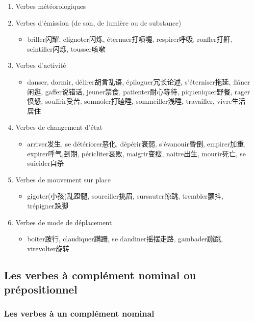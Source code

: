 \documentclass[UTF8]{report}
\begin{document}
\begin{enumerate}
    \item Verbes météorologiques
    \item Verbes d’émission (de son, de lumière ou de substance) 
    \begin{itemize}
        \item briller闪耀, clignoter闪烁, éternuer打喷嚏, respirer呼吸, ronfler打鼾, scintiller闪烁, tousser咳嗽
    \end{itemize}
    \item Verbes d’activité
    \begin{itemize}
        \item danser, dormir, délirer胡言乱语, épiloguer冗长论述, s’éterniser拖延, flâner闲逛, gaffer说错话, jeuner禁食, patienter耐心等待, piqueniquer野餐, rager愤怒, souffrir受苦, somnoler打瞌睡, sommeiller浅睡, travailler, vivre生活居住
    \end{itemize}
    \item Verbes de changement d’état
    \begin{itemize}
        \item arriver发生, se détériorer恶化, dépérir衰弱, s’évanouir昏倒, empirer加重, expirer呼气,到期, péricliter衰败, maigrir变瘦, naitre出生, mourir死亡, se suicider自杀
    \end{itemize}
    \item Verbes de mouvement sur place
    \begin{itemize}
        \item gigoter(小孩)乱蹬腿, sourciller挑眉, sursauter惊跳, trembler颤抖, trépigner跺脚
    \end{itemize}
    \item Verbes de mode de déplacement 
    \begin{itemize}
        \item boiter跛行, claudiquer蹒跚, se dandiner摇摆走路, gambader蹦跳, virevolter旋转
    \end{itemize}
\end{enumerate}

\subsection{Les verbes à complément nominal ou prépositionnel}

\subsubsection{Les verbes à un complément nominal}
\end{document}
